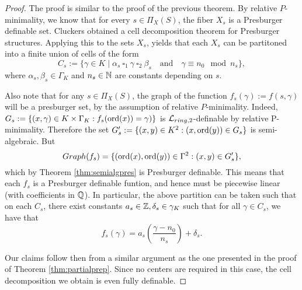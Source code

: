 \begin{proof}
The proof is similar to the proof of the previous theorem. By relative $P$-minimality, we know that for every $s \in \Pi_X(S)$, the fiber $X_s$ is a Presburger definable set. Cluckers \cite{clu-presb03} obtained a cell decomposition theorem for Presburger structures. Applying this to the sets $X_s$, yields that each
 $X_s$ can be partitoned into a finite union of cells of the form
\[C_s := \{ \gamma \in K \mid  \alpha_s\ \square_1 \ \gamma \ \square_2 \  \beta_s\quad \text{and}\quad \gamma \equiv n_0 \mod n_s\},\]
where $\alpha_s, \beta_s \in \Gamma_K$ and $n_s \in {\mathbb N}$ are constants depending on $s$. 

Also note that for any $s \in \Pi_X(S)$, the graph of the function $f_s(\gamma):= f(s,\gamma)$ will be a presburger set, by the assumption of relative $P$-minimality. Indeed, $G_s:=\{(x,\gamma)\in K\times \Gamma_K: f_s(\operatorname{ord}(x))=\gamma)\}$ is $\mathcal{L}_{ring,2}$-definable by relative P-minimality. Therefore the set $G_s':=\{(x,y)\in K^2: (x,\operatorname{ord}(y))\in G_s\}$ is semi-algebraic. But 
\[Graph(f_s)=\{(\operatorname{ord}(x),\operatorname{ord}(y))\in \Gamma^2: (x,y)\in G_s'\},\]
which by Theorem \ref{thm:semialgpres} is Presburger definable. This means that each $f_s$ is a Presburger definable funtion, and hence  must be piecewise linear (with coefficients in ${\mathbb Q}$). In particular, the above partition can be taken such that on each $C_s$, there exist constants $a_s \in {\mathbb Z}, \delta_s \in \gamma_K$ such that for all $\gamma \in C_s$, we have that
\[f_s(\gamma) = a_s \left(\frac{\gamma -n_0}{n_s}\right) + \delta_s.\]

Our claims follow then from a similar argument as the one presented in the proof of Theorem
\ref{thm:partialprep}. Since no centers are required in this case, the cell decomposition we obtain is even fully definable.

% 
% 
\end{proof}